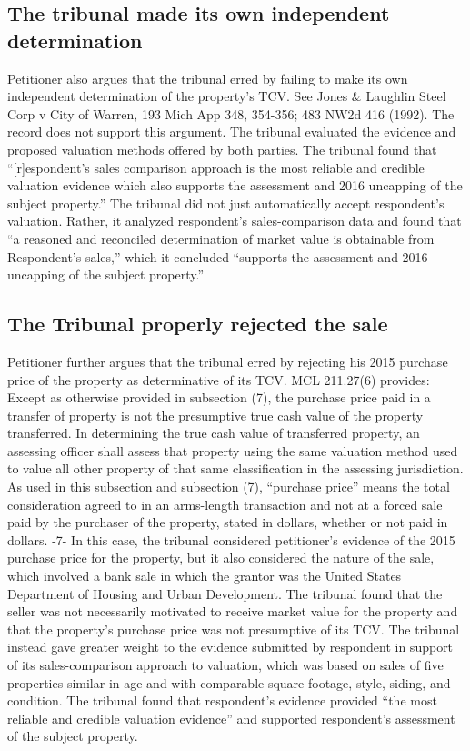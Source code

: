 \documentclass[12pt,\documentclassflag]{michiganCourtOfAppealsBrief}
\begin{document}
\subsection{The tribunal made its own independent determination}

Petitioner also argues that the tribunal erred by failing to make its own independent
determination of the property's TCV. See Jones \& Laughlin Steel Corp v City of Warren, 193
Mich App 348, 354-356; 483 NW2d 416 (1992). The record does not support this argument. The
tribunal evaluated the evidence and proposed valuation methods offered by both parties. The
tribunal found that ``[r]espondent's sales comparison approach is the most reliable and credible
valuation evidence which also supports the assessment and 2016 uncapping of the subject
property.'' The tribunal did not just automatically accept respondent's valuation. Rather, it
analyzed respondent's sales-comparison data and found that ``a reasoned and reconciled
determination of market value is obtainable from Respondent's sales,'' which it concluded
``supports the assessment and 2016 uncapping of the subject property.''


\subsection{The Tribunal properly rejected the sale}

Petitioner further argues that the tribunal erred by rejecting his 2015 purchase price of the
property as determinative of its TCV. MCL 211.27(6) provides:
Except as otherwise provided in subsection (7), the purchase price paid in a
transfer of property is not the presumptive true cash value of the property
transferred. In determining the true cash value of transferred property, an assessing
officer shall assess that property using the same valuation method used to value all
other property of that same classification in the assessing jurisdiction. As used in
this subsection and subsection (7), ``purchase price'' means the total consideration
agreed to in an arms-length transaction and not at a forced sale paid by the purchaser
of the property, stated in dollars, whether or not paid in dollars.
-7-
In this case, the tribunal considered petitioner's evidence of the 2015 purchase price for the
property, but it also considered the nature of the sale, which involved a bank sale in which the
grantor was the United States Department of Housing and Urban Development. The tribunal found
that the seller was not necessarily motivated to receive market value for the property and that the
property's purchase price was not presumptive of its TCV. The tribunal instead gave greater
weight to the evidence submitted by respondent in support of its sales-comparison approach to
valuation, which was based on sales of five properties similar in age and with comparable square
footage, style, siding, and condition. The tribunal found that respondent's evidence provided ``the
most reliable and credible valuation evidence'' and supported respondent's assessment of the
subject property. 
\end{document}
